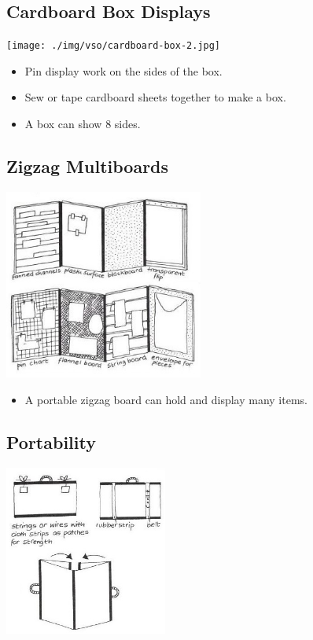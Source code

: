 \begin{multicols}{2}

\section{Cardboard Box Displays}

\begin{center}
\texttt{[image: ./img/vso/cardboard-box-2.jpg]}
\end{center}

\begin{itemize}
\item Pin display work on the sides of
the box.
\item Sew or tape cardboard sheets
together to make a box.
\item A box can show 8 sides.
\end{itemize}


\subsection{Zigzag Multiboards}

\begin{center}
\includegraphics[width=0.49\textwidth]{./img/vso/zigzag.jpg}
\end{center}

\begin{itemize}
\item A portable zigzag board can hold and display many items.
\end{itemize}

\vfill
\columnbreak

\subsection{Portability}

\begin{center}
\includegraphics[width=0.4\textwidth]{./img/vso/zigzag-portability.jpg}
\end{center}


\end{multicols}
